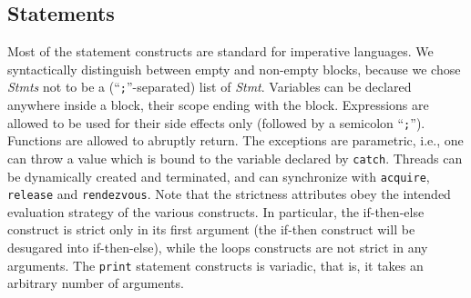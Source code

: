 \documentclass{article}
\begin{document}
\begin{kdefinition}
\begin{module}{}
\begin{kblock}[text]
 \subsection{Statements}
Most of the statement constructs are standard for imperative languages.
We syntactically distinguish between empty and non-empty blocks, because we
chose \textit{Stmts} not to be a (``\texttt{;}''-separated) list of
\textit{Stmt}.  Variables can be declared anywhere inside a block, their scope
ending with the block.  Expressions are allowed to be used for their side
effects only (followed by a semicolon ``\texttt{;}'').  Functions are allowed
to abruptly return.  The exceptions are parametric, i.e., one can throw a value
which is bound to the variable declared by \texttt{catch}.  Threads can be
dynamically created and terminated, and can synchronize with \texttt{acquire},
\texttt{release} and \texttt{rendezvous}.  Note that the strictness attributes
obey the intended evaluation strategy of the various constructs.  In
particular, the if-then-else construct is strict only in its first argument
(the if-then construct will be desugared into if-then-else), while the loops
constructs are not strict in any arguments.  The \texttt{print} statement
constructs is variadic, that is, it takes an arbitrary number of arguments. \end{kblock}

\begin{syntaxBlock}{}\syntax{\{\}}{}
\end{syntaxBlock}


\end{module}
\end{kdefinition}
\end{document}
